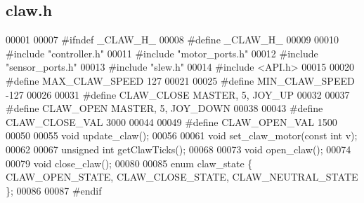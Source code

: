 \subsection{claw.\+h}
\label{a00008_source}

\begin{DoxyCode}
00001 
00007 \textcolor{preprocessor}{#ifndef \_CLAW\_H\_}
00008 \textcolor{preprocessor}{#define \_CLAW\_H\_}
00009 
00010 \textcolor{preprocessor}{#include "controller.h"}
00011 \textcolor{preprocessor}{#include "motor_ports.h"}
00012 \textcolor{preprocessor}{#include "sensor_ports.h"}
00013 \textcolor{preprocessor}{#include "slew.h"}
00014 \textcolor{preprocessor}{#include <API.h>}
00015 
00020 \textcolor{preprocessor}{#define MAX\_CLAW\_SPEED 127}
00021 
00025 \textcolor{preprocessor}{#define MIN\_CLAW\_SPEED -127}
00026 
00031 \textcolor{preprocessor}{#define CLAW\_CLOSE MASTER, 5, JOY\_UP}
00032 
00037 \textcolor{preprocessor}{#define CLAW\_OPEN MASTER, 5, JOY\_DOWN}
00038 
00043 \textcolor{preprocessor}{#define CLAW\_CLOSE\_VAL 3000}
00044 
00049 \textcolor{preprocessor}{#define CLAW\_OPEN\_VAL 1500}
00050 
00055 \textcolor{keywordtype}{void} update_claw();
00056 
00061 \textcolor{keywordtype}{void} set_claw_motor(\textcolor{keyword}{const} \textcolor{keywordtype}{int} v);
00062 
00067 \textcolor{keywordtype}{unsigned} \textcolor{keywordtype}{int} getClawTicks();
00068 
00073 \textcolor{keywordtype}{void} open_claw();
00074 
00079 \textcolor{keywordtype}{void} close_claw();
00080 
00085 \textcolor{keyword}{enum} claw_state \{ CLAW_OPEN_STATE, CLAW_CLOSE_STATE, CLAW_NEUTRAL_STATE \};
00086 
00087 \textcolor{preprocessor}{#endif}
\end{DoxyCode}
